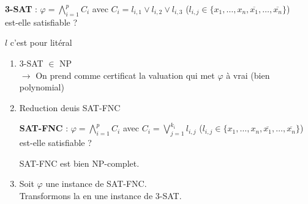 
\begin{definition}
	\textbf{3-SAT} : $\varphi = \bigwedge\limits_{i=1}^p C_i$ avec $C_i = l_{i,1} \vee l_{i,2} \vee l_{i,3}$ ($l_{i,j} \in \{x_1, \dots, x_n, \overline{x_1}, \dots, \overline{x_n}\}$)\\ est-elle satisfiable ?
\end{definition}

\begin{com}
	$l$ c'est pour litéral
\end{com}

\begin{enumerate}
	\item 3-SAT $\in$ NP \\
	$\to$ On prend comme certificat la valuation qui met $\varphi$ à vrai (bien polynomial)
	
	\item Reduction deuis SAT-FNC

	\begin{definition}
		\textbf{SAT-FNC} : $\varphi = \bigwedge\limits_{i=1}^p C_i$ avec $C_i = \bigvee\limits_{j=1}^{k_i} l_{i,j}$ ($l_{i,j} \in \{x_1, \dots, x_n, \overline{x_1}, \dots, \overline{x_n}\}$)\\ est-elle satisfiable ?
	\end{definition}

	SAT-FNC est bien NP-complet.
	
	\item Soit $\varphi$ une instance de SAT-FNC.\\
	Transformons la en une instance de 3-SAT.\\
	

\end{enumerate}
